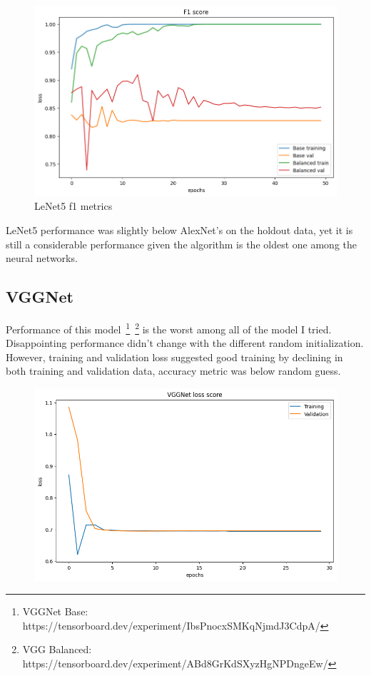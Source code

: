 \begin{figure}[H]
    \centering
    \includegraphics[width=.8\textwidth]{img/lenetf1.png}
    \caption{LeNet5 f1 metrics}
    \label{fig:lenetloss}
\end{figure}

LeNet5 performance was slightly below AlexNet's on the holdout data, yet it is still a considerable performance given the algorithm is the oldest one among the neural networks.

\subsection{VGGNet}
Performance of this model~\footnote{VGGNet Base: https://tensorboard.dev/experiment/IbsPnocxSMKqNjmdJ3CdpA/}~\footnote{VGG Balanced: https://tensorboard.dev/experiment/ABd8GrKdSXyzHgNPDngeEw/} is the worst among all of the model I tried.
Disappointing performance didn't change with the different random initialization.
However, training and validation loss suggested good training by declining in both training and validation data, accuracy metric was below random guess.

\begin{figure}[H]
    \centering
    \includegraphics[width=.8\textwidth]{img/vggnetloss.png}
    \caption{}
    \label{fig:vggloss}
\end{figure}

